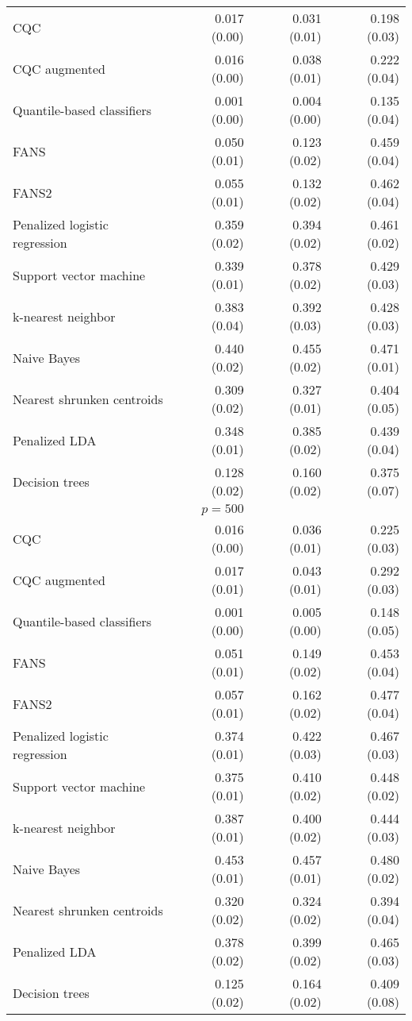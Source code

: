 \begin{table}[p]
\begin{adjustbox}{max size={\textwidth}{10cm}}
\begin{tabular}{l@{\extracolsep{15mm}}rrr}
      CQC & 0.017 (0.00) & 0.031 (0.01) & 0.198 (0.03) \\ 
      CQC augmented & 0.016 (0.00) & 0.038 (0.01) & 0.222 (0.04) \\ 
      Quantile-based classifiers & 0.001 (0.00) & 0.004 (0.00) & 0.135 (0.04) \\ 
      FANS  & 0.050 (0.01) & 0.123 (0.02) & 0.459 (0.04) \\
      FANS2 & 0.055 (0.01) & 0.132 (0.02) & 0.462 (0.04) \\
      Penalized logistic regression & 0.359 (0.02) & 0.394 (0.02) & 0.461 (0.02) \\ 
      Support vector machine & 0.339 (0.01) & 0.378 (0.02) & 0.429 (0.03) \\ 
      k-nearest neighbor & 0.383 (0.04) & 0.392 (0.03) & 0.428 (0.03) \\ 
      Naive Bayes & 0.440 (0.02) & 0.455 (0.02) & 0.471 (0.01) \\ 
      Nearest shrunken centroids & 0.309 (0.02) & 0.327 (0.01) & 0.404 (0.05) \\ 
      Penalized LDA & 0.348 (0.01) & 0.385 (0.02) & 0.439 (0.04) \\ 
      Decision trees & 0.128 (0.02) & 0.160 (0.02) & 0.375 (0.07) \\ [2ex]

      \hline
      & $p = 500$ \\
      \hline

      CQC & 0.016 (0.00) & 0.036 (0.01) & 0.225 (0.03) \\ 
      CQC augmented & 0.017 (0.01) & 0.043 (0.01) & 0.292 (0.03) \\ 
      Quantile-based classifiers & 0.001 (0.00) & 0.005 (0.00) & 0.148 (0.05) \\ 
      FANS  & 0.051 (0.01) & 0.149 (0.02) & 0.453 (0.04) \\
      FANS2 & 0.057 (0.01) & 0.162 (0.02) & 0.477 (0.04) \\
      Penalized logistic regression & 0.374 (0.01) & 0.422 (0.03) & 0.467 (0.03) \\ 
      Support vector machine & 0.375 (0.01) & 0.410 (0.02) & 0.448 (0.02) \\ 
      k-nearest neighbor & 0.387 (0.01) & 0.400 (0.02) & 0.444 (0.03) \\ 
      Naive Bayes & 0.453 (0.01) & 0.457 (0.01) & 0.480 (0.02) \\ 
      Nearest shrunken centroids & 0.320 (0.02) & 0.324 (0.02) & 0.394 (0.04) \\ 
      Penalized LDA & 0.378 (0.02) & 0.399 (0.02) & 0.465 (0.03) \\ 
      Decision trees & 0.125 (0.02) & 0.164 (0.02) & 0.409 (0.08) \\ 

      \hline
      
    \end{tabular}
  \end{adjustbox}
\end{table}




